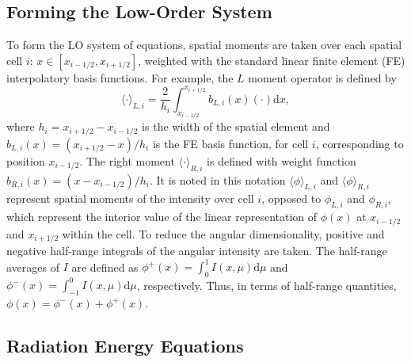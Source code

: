 \documentclass[12pt]{article}
\renewcommand{\d}{\mathrm{d}}
\newcommand{\mom}[1]{\langle #1 \rangle}
\newcommand{\xr}{{x_{i+1/2}}}
\newcommand{\il}{{i-1/2}}
\newcommand{\ir}{{i+1/2}}
\begin{document}
\begin{center}
\section{Forming the Low-Order System}

To form the LO system of equations, spatial moments are taken over each spatial cell $i$:
$x\in[x_{i-1/2},x_{i+1/2}]$, weighted with the standard linear finite element (FE)
interpolatory basis functions.  For example, the $L$  moment operator is defined by
\begin{equation}\label{x_mom}
\mom{\cdot}_{L,i} = \frac{2}{h_i} \int_{x_{i-1/2}}^{\xr} b_{L,i}(x) (\cdot) \d x,
\end{equation}
where $h_i=x_{i+1/2}-x_{i-1/2}$ is the width of the spatial element and
$b_{L,i}(x)=(x_{i+1/2}-x)/h_i$ is the FE basis function, for cell $i$, corresponding to position
$x_{i-1/2}$.  The right moment $\mom{\cdot}_{R,i}$ is defined with weight function $b_{R,i}(x)=(x -
x_{i-1/2})/h_i$. It is noted in this notation $\mom{\phi}_{L,i}$ and
$\mom{\phi}_{R,i}$ represent spatial moments of the intensity over cell $i$, opposed
to $\phi_{L,i}$ and $\phi_{R,i}$, which represent the interior value of the linear
representation of $\phi(x)$ at $x_\il$ and $x_\ir$ within the cell. To reduce the angular dimensionality, positive and
negative half-range integrals of the angular intensity are taken.  The half-range
averages of $I$ are defined as $ \phi^+(x) = \int_0^{1} I(x,\mu) \d \mu$ and $ \phi^-(x) = \int_{-1}^{0} I(x,\mu) \d
\mu$, respectively.  Thus, in terms of half-range quantities, $\phi(x) = \phi^-(x) +
\phi ^+(x)$.  

\subsection{Radiation Energy Equations}


\end{center}
\end{document}
